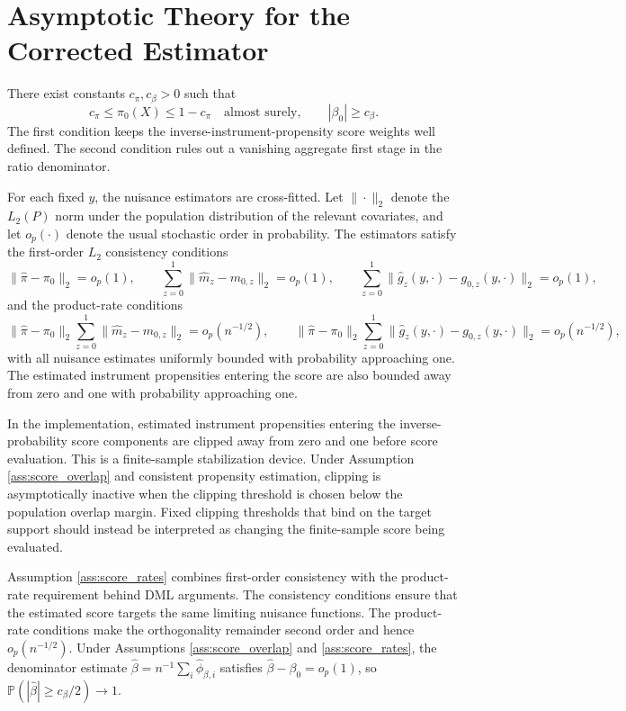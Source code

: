 \documentclass[final,3p,fleqn, 10pt]{elsarticle}
\begin{document}
\section{Asymptotic Theory for the Corrected Estimator}
\label{sec:asymptotics}

\begin{assumption}
\label{ass:score_overlap}
There exist constants $c_{\pi}, c_{\beta} > 0$ such that
\[
c_{\pi} \le \pi_0(X) \le 1-c_{\pi}
\quad \text{almost surely},
\qquad
|\beta_0| \ge c_{\beta}.
\]
The first condition keeps the inverse-instrument-propensity score weights well defined. The second condition rules out a vanishing aggregate first stage in the ratio denominator.
\end{assumption}

\begin{assumption}
\label{ass:score_rates}
For each fixed $y$, the nuisance estimators are cross-fitted. Let $\|\cdot\|_2$ denote the $L_2(P)$ norm under the population distribution of the relevant covariates, and let $o_p(\cdot)$ denote the usual stochastic order in probability. The estimators satisfy the first-order $L_2$ consistency conditions
\[
\|\hat{\pi} - \pi_0\|_2=o_p(1), \qquad
\sum_{z=0}^{1}\|\hat{m}_z-m_{0,z}\|_2=o_p(1), \qquad
\sum_{z=0}^{1}\|\hat{g}_z(y,\cdot)-g_{0,z}(y,\cdot)\|_2=o_p(1),
\]
and the product-rate conditions
\[
\|\hat{\pi} - \pi_0\|_2 \sum_{z=0}^{1} \|\hat{m}_z - m_{0,z}\|_2 = o_p(n^{-1/2}),
\qquad
\|\hat{\pi} - \pi_0\|_2 \sum_{z=0}^{1} \|\hat{g}_z(y,\cdot) - g_{0,z}(y,\cdot)\|_2 = o_p(n^{-1/2}),
\]
with all nuisance estimates uniformly bounded with probability approaching one. The estimated instrument propensities entering the score are also bounded away from zero and one with probability approaching one.
\end{assumption}

In the implementation, estimated instrument propensities entering the inverse-probability score components are clipped away from zero and one before score evaluation. This is a finite-sample stabilization device. Under Assumption \ref{ass:score_overlap} and consistent propensity estimation, clipping is asymptotically inactive when the clipping threshold is chosen below the population overlap margin. Fixed clipping thresholds that bind on the target support should instead be interpreted as changing the finite-sample score being evaluated.

Assumption \ref{ass:score_rates} combines first-order consistency with the product-rate requirement behind DML arguments. The consistency conditions ensure that the estimated score targets the same limiting nuisance functions. The product-rate conditions make the orthogonality remainder second order and hence $o_p(n^{-1/2})$. Under Assumptions \ref{ass:score_overlap} and \ref{ass:score_rates}, the denominator estimate $\hat{\beta}=n^{-1}\sum_i \hat{\phi}_{\beta,i}$ satisfies $\hat{\beta}-\beta_0=o_p(1)$, so $\mathbb{P}(|\hat{\beta}|\ge c_{\beta}/2)\to1$.
\end{document}
